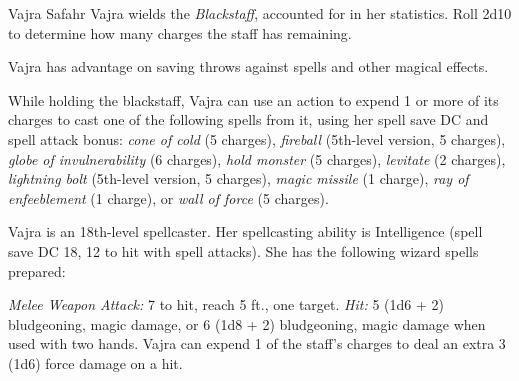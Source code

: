 \documentclass[10pt,a4paper,twoside,bg=print,twocolumn,openany,nodeprecatedcode]{dndbook}
\begin{document}
\begin{DndMonster}[float=t]{Vajra Safahr}
\DndMonsterBasics[
armor-class = {14 (17 with \textit{mage armor})},
hit-points = {\DndDice{23d8 + 23}},
speed = {30 ft.}
]
\DndMonsterAbilityScores[
 str = 10,
 dex = 14,
 con = 12,
 int = 20,
 wis = 11,
 cha = 16
]
\DndMonsterDetails[
saving-throws = {Str +2, Dex +4, Con +3, Int +12, Wis +7, Cha +5},
skills = {Arcana +10, History +10},
languages = {Common, Dwarvish, Elvish, Giant, Halfling, Undercommon},
challenge = 13,
]
Vajra wields the \textit{Blackstaff}, accounted for in her statistics. Roll 2d10 to determine how many charges the staff has remaining.

Vajra has advantage on saving throws against spells and other magical effects.

While holding the blackstaff, Vajra can use an action to expend 1 or more of its charges to cast one of the following spells from it, using her spell save DC and spell attack bonus: \textit{cone of cold} (5 charges), \textit{fireball} (5th-level version, 5 charges), \textit{globe of invulnerability} (6 charges), \textit{hold monster} (5 charges), \textit{levitate} (2 charges), \textit{lightning bolt} (5th-level version, 5 charges), \textit{magic missile} (1 charge), \textit{ray of enfeeblement} (1 charge), or \textit{wall of force} (5 charges).

Vajra is an 18th-level spellcaster. Her spellcasting ability is Intelligence (spell save DC 18, 12 to hit with spell attacks). She has the following wizard spells prepared:
\begin{DndMonsterSpells}
\end{DndMonsterSpells}
\textsl{Melee Weapon Attack:} 7 to hit, reach 5 ft., one target. \textsl{Hit:} 5 (1d6 + 2) bludgeoning, magic damage, or 6 (1d8 + 2) bludgeoning, magic damage when used with two hands. Vajra can expend 1 of the staff's charges to deal an extra 3 (1d6) force damage on a hit.

\end{DndMonster}
\end{document}
